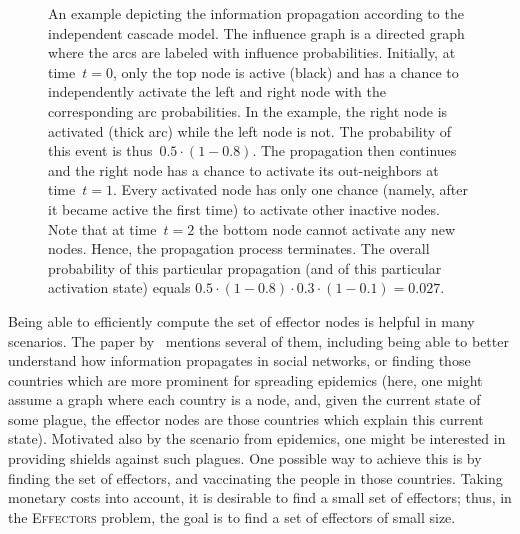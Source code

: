 \documentclass{article}
\newcommand{\probEffectors}{\textsc{Effectors}\xspace}
\begin{document}
\begin{figure}
    \caption{An example depicting the information propagation according to the independent cascade model. The influence graph is a directed graph where the arcs are labeled with influence probabilities. Initially, at time~$t=0$, only the top node is active (black) and has a chance to independently activate the left and right node with the corresponding arc probabilities.
      In the example, the right node is activated (thick arc) while the left node is not. The probability of this event is thus~$0.5\cdot (1-0.8)$. The propagation then continues and the right node has a chance to activate its out-neighbors at time~$t=1$. Every activated node has only one chance (namely, after it became active the first time) to activate other inactive nodes. Note that at time~$t=2$ the bottom node cannot activate any new nodes. Hence, the propagation process terminates. The overall probability of this particular propagation (and of this particular activation state) equals $0.5\cdot(1-0.8)\cdot 0.3\cdot(1-0.1)=0.027$.
    }
  \label{fig:intro-example}
\end{figure}

Being able to efficiently compute the set of effector nodes is helpful in many scenarios.
The paper by~\citet{LTGMH10} mentions several of them,
including being able to better understand how information propagates in social networks,
or finding those countries which are more prominent for spreading epidemics
(here, one might assume a graph where each country is a node,
and,
given the current state of some plague,
the effector nodes are those countries which explain this current state).
Motivated also by the scenario from epidemics,
one might be interested in providing shields against such plagues.
One possible way to achieve this is by finding the set of effectors,
and vaccinating the people in those countries.
Taking monetary costs into account,
it is desirable to find a small set of effectors;
thus,
in the \probEffectors problem,
the goal is to find a set of effectors of small size.
\end{document}
